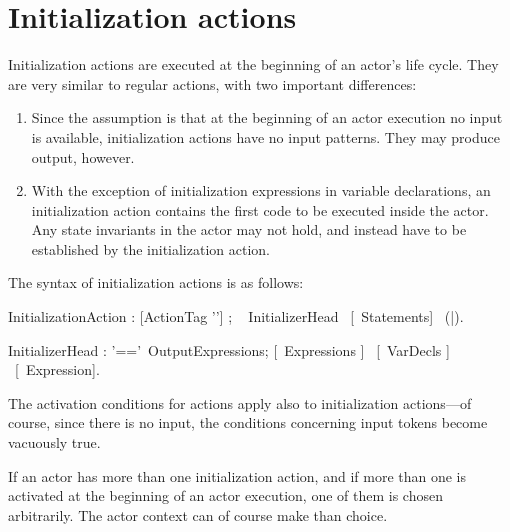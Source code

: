 

\section{Initialization actions}\label{sect:InitActions}



Initialization
actions are executed at the beginning of an actor's life cycle. They
are very similar to regular actions, with two important differences:
\begin{enumerate}
\item Since the assumption is that at the beginning of an actor
  execution no input is available, initialization actions have no
  input patterns. They may produce output, however.
\item With the exception of initialization expressions in variable
  declarations, an initialization action contains the first code to be
  executed inside the actor. Any state invariants in the actor may not
  hold, and instead have to be established by the initialization action.
\end{enumerate}

The syntax of initialization actions is as follows:


\bgr
InitializationAction : [ActionTag '\charColon'] ;
    \kwInitialize~ InitializerHead ~[\kwDo ~Statements]~ (\kwEnd|\kwEndInitialize).

InitializerHead : '==\charMore'~OutputExpressions;
             [\kwGuard~Expressions ] ~[\kwVar~VarDecls ] ~[\kwDelay ~Expression].
\egr


The activation conditions for actions
apply also to initialization actions---of course, since there is no
input, the conditions concerning input tokens become vacuously true.

\pagebreak[4]

If an actor has more
than one initialization action, and if more than one is activated at
the beginning of an actor execution, one of them is chosen 
arbitrarily. The actor context can of course make than choice.








